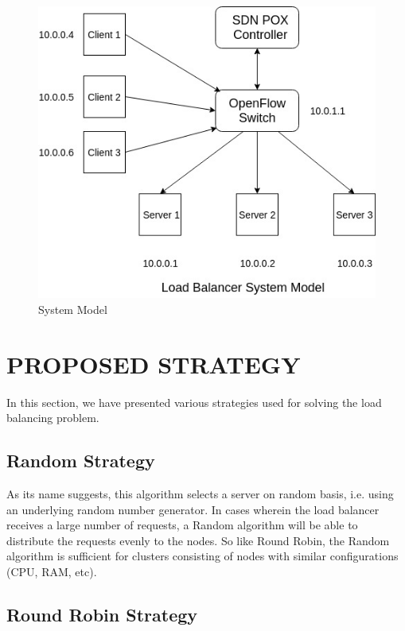 \documentclass[letterpaper, 10 pt, conference]{IEEEtran}
\begin{document}
\begin{figure}[ht!]
\centering
\includegraphics[width=\linewidth]{SystemModel.jpg}
\caption{System Model \label{fig:2}}
\end{figure}


\section{PROPOSED STRATEGY}
In this section, we have presented various strategies used for solving the load balancing problem.


\subsection{Random Strategy}
As its name suggests, this algorithm selects a server on random basis, i.e. using an underlying random number generator. In cases wherein the load balancer receives a large number of requests, a Random algorithm will be able to distribute the requests evenly to the nodes. So like Round Robin, the Random algorithm is sufficient for clusters consisting of nodes with similar configurations (CPU, RAM, etc). 


\subsection{Round Robin Strategy}
\end{document}
